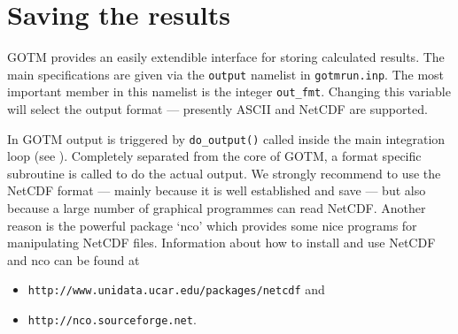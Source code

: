 %
%

\section{Saving the results \label{sec:output} }

GOTM provides an easily extendible interface for storing calculated results.
The main specifications are given via the {\tt output} namelist in
{\tt gotmrun.inp}. The most important member in this namelist is
the integer {\tt out\_fmt}. Changing this variable will select the output format
--- presently ASCII and NetCDF are supported.

In GOTM output is triggered by {\tt do\_output()}
called inside the main integration loop (see ).
Completely separated from the core of GOTM, a format specific
subroutine is called to do the actual output.  We strongly recommend
to use the NetCDF format --- mainly because it is well established and
save --- but also because a large number of graphical programmes can
read NetCDF. Another reason is the powerful package `nco' which
provides some nice programs for manipulating NetCDF files. Information
about how to install and use NetCDF and nco can be found at 
\begin{itemize}
 \item {\tt http://www.unidata.ucar.edu/packages/netcdf} and 
 \item {\tt http://nco.sourceforge.net}.
\end{itemize}


